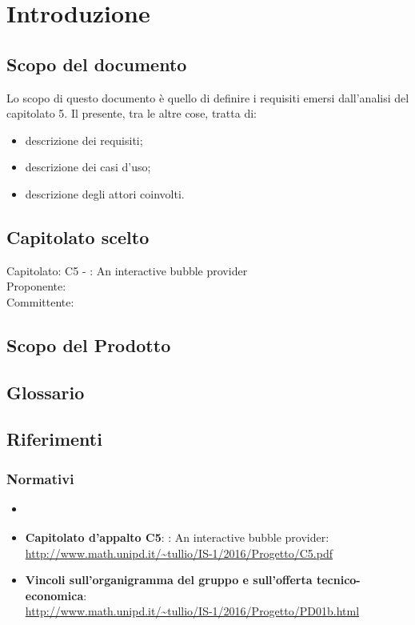 \section{Introduzione}

\subsection{Scopo del documento}
Lo scopo di questo documento è quello di definire i requisiti emersi dall'analisi del capitolato 5.
Il presente, tra le altre cose, tratta di:
\begin{itemize}
	\item descrizione dei requisiti;
	\item descrizione dei casi d'uso;
	\item descrizione degli attori coinvolti.
\end{itemize}

\subsection{Capitolato scelto}
Capitolato: C5 - \ProjectName{}: An interactive bubble provider \\
Proponente: \Proponente{} \\
Committente: \CommittenteInline{} \\

\subsection{Scopo del Prodotto}
\ScopoDelProdotto

\subsection{Glossario}
\GlossarioIntroduzione

\subsection{Riferimenti}
\subsubsection{Normativi}
\begin{itemize}
	\item \textbf{\NormeDiProgetto}
	\item\textbf{Capitolato d'appalto C5}: \ProjectName{}: An interactive bubble provider:\\ \url{http://www.math.unipd.it/~tullio/IS-1/2016/Progetto/C5.pdf}
	\item \textbf{Vincoli sull'organigramma del gruppo e sull'offerta tecnico-economica}: \\ \url{http://www.math.unipd.it/~tullio/IS-1/2016/Progetto/PD01b.html}
\end{itemize}

